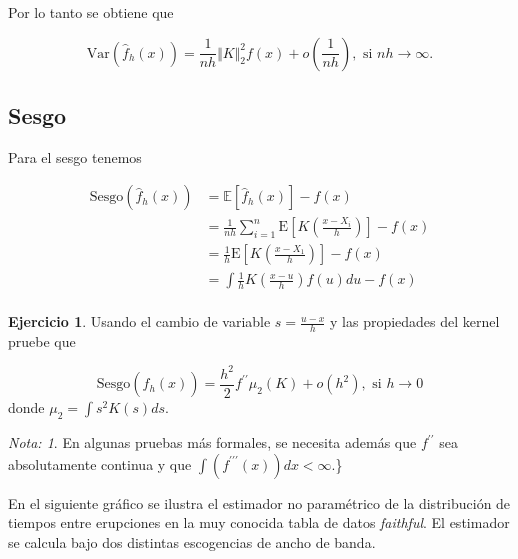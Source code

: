 \documentclass[
  12pt,
]{book}
\theoremstyle{definition}
\theoremstyle{definition}
\theoremstyle{definition}
\newtheorem{exercise}{Ejercicio}[chapter]
\theoremstyle{definition}
\theoremstyle{remark}
\newtheorem*{remark}{Nota: }
\begin{document}
Por lo tanto se obtiene que

\begin{equation*}
\mathrm{Var}\left(\hat{f}_{h}(x)\right) = \frac{1}{nh} \Vert K\Vert_{2}^{2}f(x) + o\left(\frac{1}{nh}\right), \text{ si } nh\to \infty.
\end{equation*}

\hypertarget{sesgo-1}{%
\subsection{Sesgo}\label{sesgo-1}}

Para el sesgo tenemos

\begin{align*}
\mathrm{Sesgo}\left(\hat{f}_{h}(x)\right)
& = \mathbb{E}\left[\hat{f}_{h}(x)\right]-f(x)                                                  \\
& = \frac{1}{nh} \sum_{i=1}^{n} \mathrm{E}\left[K\left( \frac{x-X_{i}}{h} \right)\right] - f(x) \\
& = \frac{1}{h}\mathrm{E}\left[K\left( \frac{x-X_{1}}{h} \right)\right] - f(x)                  \\
& = \int \frac{1}{h} K\left( \frac{x-u}{h}\right)f(u)du -f(x)                                   \\
\end{align*}

\begin{exercise}
\protect\hypertarget{exr:unnamed-chunk-25}{}\label{exr:unnamed-chunk-25}Usando el cambio de variable \(s=\frac{u-x}{h}\) y las propiedades del kernel pruebe que

\begin{equation*}
\mathrm{Sesgo}\left(\hat{f}_{h}(x)\right) = \frac{h^{2}}{2} f^{\prime\prime} \mu_{2}(K) + o(h^{2}), \text{ si } h\to 0
\end{equation*}
donde \(\mu_{2}=\int s^{2}K(s)ds\).
\end{exercise}

\begin{remark}
En algunas pruebas más formales, se necesita además que \(f^{\prime\prime}\) sea absolutamente continua y que \(\int(f^{\prime\prime\prime}(x))dx<\infty\).\}
\end{remark}

En el siguiente gráfico se ilustra el estimador no paramétrico de la distribución de tiempos entre erupciones en la muy conocida tabla de datos \emph{faithful}. El estimador se calcula bajo dos distintas escogencias de ancho de banda.
\end{document}
